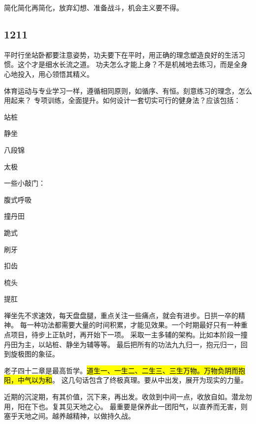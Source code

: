 简化简化再简化，放弃幻想、准备战斗，机会主义要不得。

\subsection{1211}

平时行坐站卧都要注意姿势，功夫要下在平时，用正确的理念塑造良好的生活习惯。这个才是细水长流之道。
功夫怎么才能上身？不是机械地去练习，而是全身心地投入，用心领悟其精义。

体育运动与专业学习一样，遵循相同原则，如循序、有恒。刻意练习的理念，怎么用起来？
专项训练，全面提升。如何设计一套切实可行的健身法？应该包括：
\begin{enumbox}
\item 站桩
\item 静坐
\item 八段锦
\item 太极
\end{enumbox}

一些小敲门：
\begin{enumbox}
\item 腹式呼吸
\item 撞丹田
\item 跪式
\item 刷牙
\item 扣齿
\item 梳头
\item 提肛
\end{enumbox}

禅坐先不求速效，每天盘盘腿，重点关注一些痛点，就会有进步。日拱一卒的精神。
每一种功法都需要大量的时间积累，才能见效果。一个时期最好只有一种重点项目，待步上正轨时，再开始下一项。
采取一主多辅的架构。比如本阶段一撞丹田为主，以站桩、静坐为辅等等。
最后把所有的功法九九归一，抱元归一，回到旋极图的象征。

老子四十二章是最高哲学。\hl{道生一、一生二、二生三、三生万物。万物负阴而抱阳，中气以为和}。
这几句话包含了终极真理。要从中出发，展开为现实的力量。

近期的沉淀期，有其价值，沉下来，再出发。收敛到中间一点，收放自如。潜龙勿用，阳在下也。复其见天地之心。
最重要是保养此一团阳气，以直养而无害，则塞乎天地之间。越养越精神，以做持久战。
